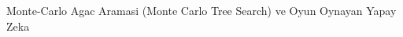 \documentclass[12pt,fleqn]{article}\usepackage{../../common}
\begin{document}
Monte-Carlo Agac Aramasi (Monte Carlo Tree Search) ve Oyun Oynayan Yapay Zeka
\end{document}
